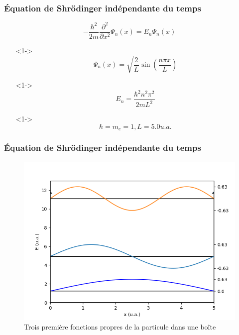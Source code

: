 \documentclass{beamer}
\begin{document}
\begin{frame}
\frametitle{Équation de Shrödinger indépendante du temps}


\begin{equation}\tag{4}
-\frac{\hbar^2}{2m}\frac{\partial^2}{\partial x^2}\Psi_n(x)=E_n\Psi_n(x)
\end{equation} 

\begin{itemize}
\item[]<1-> \begin{equation}\tag{5}
\Psi_n(x)=\sqrt{\frac{2}{L}}\sin(\frac{n\pi x}{L})
\end{equation}  

\item[]<1-> \begin{equation}\tag{8}
E_n=\frac{\hbar^2n^2\pi^2}{2mL^2} 
\end{equation} 
\item[]<1-> \begin{equation}\tag{9}
\hbar=m_e=1 , L=5.0 u.a. 
\end{equation} 

\end{itemize}

\end{frame}


\begin{frame}
\frametitle{Équation de Shrödinger indépendante du temps}
\begin{figure}[h]
\includegraphics[scale=0.5]{fct_propre}
\caption{Trois première fonctions propres de la particule dans une boîte}
\end{figure}
\end{frame}
\end{document}
